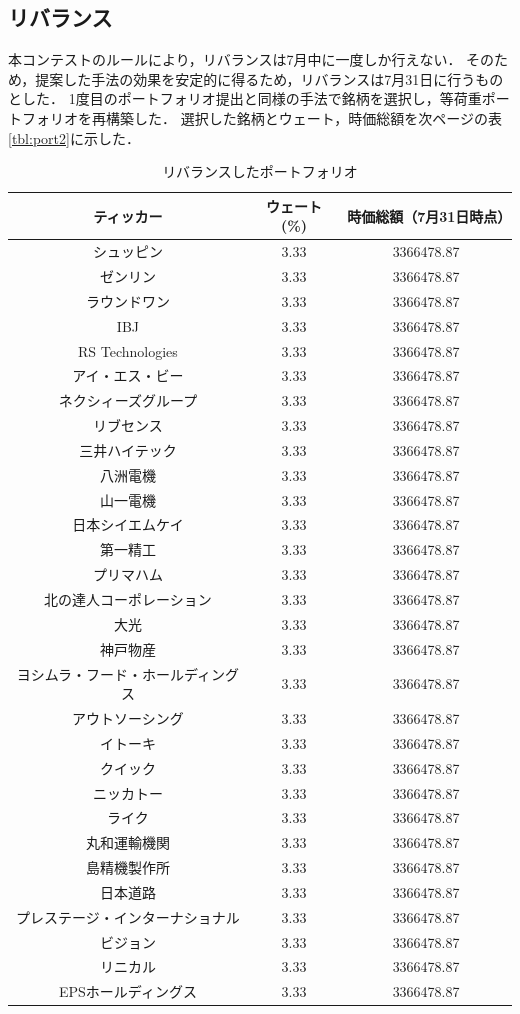 ﻿\documentclass[a4paper]{jarticle}
\begin{document}
\subsection{リバランス}
本コンテストのルールにより，リバランスは7月中に一度しか行えない．
そのため，提案した手法の効果を安定的に得るため，リバランスは7月31日に行うものとした．
1度目のポートフォリオ提出と同様の手法で銘柄を選択し，等荷重ポートフォリオを再構築した．
選択した銘柄とウェート，時価総額を次ページの表\ref{tbl:port2}に示した．
\begin{table}[htbp]
\caption{リバランスしたポートフォリオ}
\begin{center}
\begin{tabular}{|c|c|c|}
\hline
ティッカー & ウェート(\%) & 時価総額（7月31日時点）\\
\hline
\hline
シュッピン & 3.33 & 3366478.87\\
ゼンリン & 3.33 & 3366478.87\\
ラウンドワン & 3.33 & 3366478.87\\
IBJ & 3.33 & 3366478.87\\
RS Technologies & 3.33 & 3366478.87\\
アイ・エス・ビー & 3.33 & 3366478.87\\
ネクシィーズグループ & 3.33 & 3366478.87\\
リブセンス & 3.33 & 3366478.87\\
三井ハイテック & 3.33 & 3366478.87\\
八洲電機 & 3.33 & 3366478.87\\
山一電機 & 3.33 & 3366478.87\\
日本シイエムケイ & 3.33 & 3366478.87\\
第一精工 & 3.33 & 3366478.87\\
プリマハム & 3.33 & 3366478.87\\
北の達人コーポレーション & 3.33 & 3366478.87\\
大光 & 3.33 & 3366478.87\\
神戸物産 & 3.33 & 3366478.87\\
ヨシムラ・フード・ホールディングス & 3.33 & 3366478.87\\
アウトソーシング & 3.33 & 3366478.87\\
イトーキ & 3.33 & 3366478.87\\
クイック & 3.33 & 3366478.87\\
ニッカトー & 3.33 & 3366478.87\\
ライク & 3.33 & 3366478.87\\
丸和運輸機関 & 3.33 & 3366478.87\\
島精機製作所 & 3.33 & 3366478.87\\
日本道路 & 3.33 & 3366478.87\\
プレステージ・インターナショナル& 3.33 & 3366478.87\\
ビジョン & 3.33 & 3366478.87\\
リニカル & 3.33 & 3366478.87\\
EPSホールディングス & 3.33 & 3366478.87\\


\end{tabular}
\end{center}
\end{table}
\end{document}
